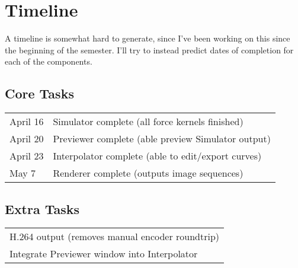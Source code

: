\documentclass{acmsiggraph}
\begin{document}
\section{Timeline}

A timeline is somewhat hard to generate, since I've been working on this since the beginning of the semester. I'll try to instead predict dates of completion for each of the components.

\subsection{Core Tasks}

\begin{tabular}{ l l }
    April 16 & Simulator complete (all force kernels finished)\\
    April 20 & Previewer complete (able preview Simulator output)\\
    April 23 & Interpolator complete (able to edit/export curves)\\
    May 7 & Renderer complete (outputs image sequences)\\
\end{tabular}

\subsection{Extra Tasks}

\begin{tabular}{ l }
    H.264 output (removes manual encoder roundtrip)\\
    Integrate Previewer window into Interpolator\\
\end{tabular}


\nocite{*}

\end{document}
